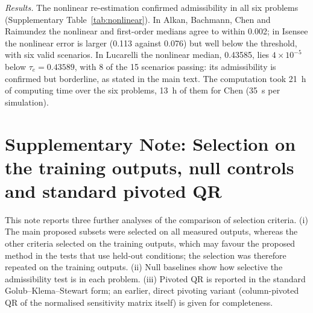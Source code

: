 \emph{Results.} The nonlinear re-estimation confirmed admissibility in all six problems (Supplementary Table~\ref{tab:nonlinear}). In Alkan, Bachmann, Chen and Raimundez the nonlinear and first-order medians agree to within 0.002; in Isensee the nonlinear error is larger (0.113 against 0.076) but well below the threshold, with six valid scenarios. In Lucarelli the nonlinear median, 0.43585, lies $4\times10^{-5}$ below $\tau_e=0.43589$, with 8 of the 15 scenarios passing: its admissibility is confirmed but borderline, as stated in the main text. The computation took 21~h of computing time over the six problems, 13~h of them for Chen (35~s per simulation).

\begin{table}[ht]
\centering\scriptsize
\caption{\textbf{Nonlinear check of the problems decided to first order.} Median $e_{\mathrm{fit}}$ over the 15 scenarios at $\pm$5\% to first order (as in the selection) and after nonlinear re-estimation of the final subset; valid scenarios, fraction of them with $e_{\mathrm{fit}}\le\tau_e$, and computing time.}\label{tab:nonlinear}

\end{table}

\section*{Supplementary Note: Selection on the training outputs, null controls and standard pivoted QR}

This note reports three further analyses of the comparison of selection criteria. (i) The main proposed subsets were selected on all measured outputs, whereas the other criteria selected on the training outputs, which may favour the proposed method in the tests that use held-out conditions; the selection was therefore repeated on the training outputs. (ii) Null baselines show how selective the admissibility test is in each problem. (iii) Pivoted QR is reported in the standard Golub--Klema--Stewart form; an earlier, direct pivoting variant (column-pivoted QR of the normalised sensitivity matrix itself) is given for completeness.

